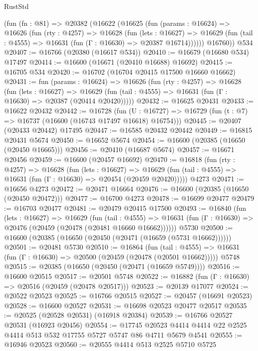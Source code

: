 \begin{lexlean}{RustStd}
\begin{coremodule}
{\begin{coremodule}
{{{{{{{{{{{{{{{{{{{{{{{{{{{{{{{{{{{{{{{{{{{{{{{{{{{{{{{    (fun (fn : @81) =>
    @20382
      (@16622
        (@16625
          (fun (params : @16624) =>
          @16626
            (fun (rty : @4257) =>
            @16628
              (fun (lets : @16627) =>
              @16629 (fun (tail : @4555) => @16631 (fun (Γ : @16630) => @20387 @16714))))))
        @16760))
    @534
@20407 := @16766 (@20380 (@16617 @534))
@20410 := @16679 (@16680 @534) @17497
@20414 := @16600 (@16671 (@20410 @16688) @16692)
@20415 := @16705 @534
@20420 := @16702 (@16704 @20415 @17500 @16660 @16662)
@20431 := fun (params : @16624) =>
  @16626
    (fun (rty : @4257) =>
    @16628
      (fun (lets : @16627) =>
      @16629 (fun (tail : @4555) => @16631 (fun (Γ : @16630) => @20387 (@20414 @20420)))))
@20432 := @16625 @20431
@20433 := @16622 @20432
@20442 := @16728
    (fun (U : @16727) => @16729 (fun (t : @7) => @16737 (@16600 (@16743 @17497 @16618) @16754)))
@20445 := @20407 (@20433 @20442) @17495
@20447 := @16585 @20432 @20442
@20449 := @16815 @20431 @5674
@20450 := @16652 @5674
@20454 := @16600 (@20385 (@16650 (@20450 @16665)))
@20456 := @20410 (@16687 @5674)
@20457 := @16671 @20456
@20459 := @16600 (@20457 @16692)
@20470 := @16818
    (fun (rty : @4257) =>
    @16628
      (fun (lets : @16627) =>
      @16629 (fun (tail : @4555) => @16631 (fun (Γ : @16630) => @20454 (@20459 @20420)))))
    @4273
@20471 := @16656 @4273
@20472 := @20471 @16664
@20476 := @16600 (@20385 (@16650 (@20450 @20472)))
@20477 := @16700 @4273
@20478 := @16699 @20477
@20479 := @16703 @20477
@20481 := @20479 @20415 @17500
@20493 := @16840
    (fun (lets : @16627) =>
    @16629
      (fun (tail : @4555) =>
      @16631 (fun (Γ : @16630) => @20476 (@20459 (@20478 (@20481 @16660 @16662))))))
    @5730
@20500 := @16600 (@20385 (@16650 (@20450 (@20471 (@16659 (@5731 @16662))))))
@20501 := @20481 @5730
@20510 := @16864
    (fun (tail : @4555) => @16631 (fun (Γ : @16630) => @20500 (@20459 (@20478 (@20501 @16662)))))
    @5748
@20515 := @20385 (@16650 (@20450 (@20471 (@16659 @5749))))
@20516 := @16600 @20515
@20517 := @20501 @5748
@20522 := @16882 (fun (Γ : @16630) => @20516 (@20459 (@20478 @20517)))
@20523 := @20139 @17077
@20524 := @20522 @20523
@20525 := @16766 @20515
@20527 := @20457 (@16691 @20523)
@20528 := @16600 @20527
@20531 := @16698 @20523 @20477 @20517
@20535 := @20525 (@20528 @20531) (@16918 @20384)
@20539 := @16766 @20527 @20531 (@16923 @20456)
@20554 := @17745
    @20523
    @4414
    @4414
    @22
    @2525
    @4414
    @513
    @532
    @17755
    @5727
    @5747
    @86
    @4711
    @5679
    @4541
@20555 := @16946 @20523
@20560 := @20555 @4414 @513 @2525 @5710 @5725
}}}}}}}}}}}}}}}}}}}}}}}}}}}}}}}}}}}}}}}}}}}}}}}}}}}}}}}
\end{coremodule}}
\end{coremodule}
\end{lexlean}

